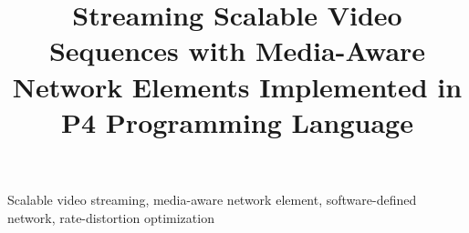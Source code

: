 \documentclass[10pt, conference]{IEEEtran}
\begin{document}
\sloppy

\title{
Streaming Scalable Video Sequences with Media-Aware Network Elements Implemented in P4 Programming Language
}

\author{ 
\vspace{2pt}
}

\maketitle

\begin{abstract}
\end{abstract}

\begin{IEEEkeywords}
Scalable video streaming, media-aware network element, software-defined network, rate-distortion optimization
\end{IEEEkeywords}










\end{document}
